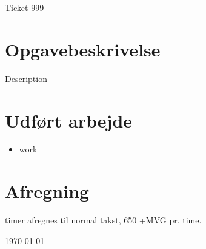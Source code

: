 
\def \companyName		{Example }
\def \ticketNumber		{Ticket 999}
\def \overskrift		{\textbf{}}	%

\def \aftaltPris		{520 }
\def \normalPris		{650 }
\def \weekendPris		{975 }
\def \freeTimer			{ }
\def \afregningFree		{\freeTimer timer afregnes til takst, 0,- +MVG pr. time.}

\def \aftaltTimer		{ }
\def \afregningAftalt	{\aftaltTimer timer afregnes til aftalt takst, \aftaltPris +MVG pr. time.}

\def \normalTimer		{ }
\def \afregningNormal	{\normalTimer timer afregnes til normal takst, \normalPris +MVG pr. time.}

\def \weekendTimer		{ }
\def \afregningWeekend	{\weekendTimer timer afregnes til arbejde udenfor normal arbejdstids takst, \weekendPris +MVG pr. time.}

\def \afregning			{\afregningNormal}		%


\begin{center} \vspace*{10mm} \large \ticketNumber \normalsize \end{center}
\thispagestyle{SYNACKSALEFOOTER} 
\vspace*{-30mm}
\vspace*{10mm}
\section*{Opgavebeskrivelse}
	Description

\section*{Udført arbejde}
\begin{itemize}
	\item work
	
\end{itemize}

\section*{Afregning}
\afregning


\vfill
\begin{center}
	{\today}
	\vspace*{1cm}
\end{center}


